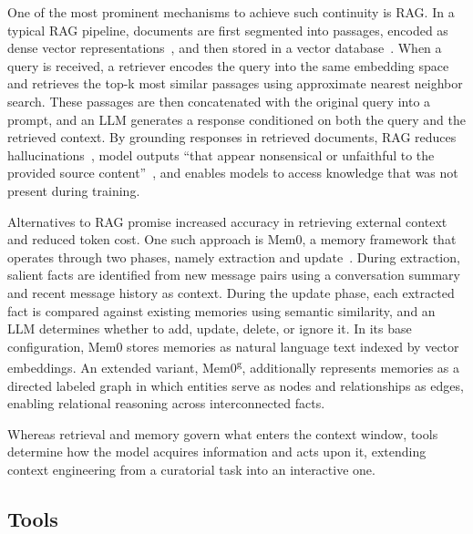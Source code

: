 \documentclass[
english,                 %
bibtex,                  %
]{kththesis}
\numberwithin{listing}{chapter}
\begin{document}
One of the most prominent mechanisms to achieve such continuity is \gls{RAG}. In a typical \gls{RAG} pipeline, documents are first segmented into passages, encoded as dense vector representations~\cite{fan_survey_2024}, and then stored in a vector database~\cite{ramos_review_2025}. When a query is received, a retriever encodes the query into the same embedding space and retrieves the top-k most similar passages using approximate nearest neighbor search. These passages are then concatenated with the original query into a prompt, and an \gls{LLM} generates a response conditioned on both the query and the retrieved context. By grounding responses in retrieved documents, \gls{RAG} reduces hallucinations~\cite{shuster_retrieval_2021}, model outputs ``that appear nonsensical or unfaithful to the provided source content''~\cite{huang_survey_2025}, and enables models to access knowledge that was not present during training.

Alternatives to \gls{RAG} promise increased accuracy in retrieving external context and reduced token cost. One such approach is Mem0, a memory framework that operates through two phases, namely extraction and update~\cite{chhikara_mem0_2025}. During extraction, salient facts are identified from new message pairs using a conversation summary and recent message history as context. During the update phase, each extracted fact is compared against existing memories using semantic similarity, and an \gls{LLM} determines whether to add, update, delete, or ignore it. In its base configuration, Mem0 stores memories as natural language text indexed by vector embeddings. An extended variant, Mem0\textsuperscript{g}, additionally represents memories as a directed labeled graph in which entities serve as nodes and relationships as edges, enabling relational reasoning across interconnected facts.

Whereas retrieval and memory govern what enters the context window, tools determine how the model acquires information and acts upon it, extending context engineering from a curatorial task into an interactive one.

\subsection{Tools}
\label{sec:bg_tools}
\glsresetall
\end{document}
